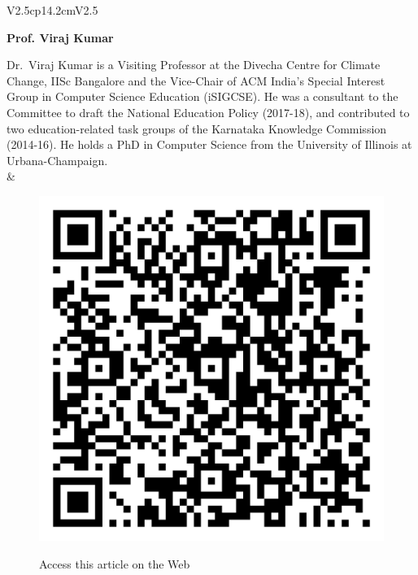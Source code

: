 \begin{tabular}{V{2.5}cp{14.2cm}V{2.5}}
\centerline{\large\bf Prof. Viraj Kumar}

\bigskip
Dr.~Viraj Kumar is a Visiting Professor at the Divecha Centre for Climate Change, IISc Bangalore and the Vice-Chair of ACM India’s Special Interest Group in Computer Science Education (iSIGCSE). He was a consultant to the Committee to draft the National Education Policy (2017-18), and contributed to two education-related task groups of the Karnataka Knowledge Commission (2014-16). He holds a PhD in Computer Science from the University of Illinois at Urbana-Champaign.\\
&\\
\end{tabular}


\begin{figure}[H]
\centering
\includegraphics[scale=.11]{src/Figures/QR-codes/qr-code_experiential-learning.png}

\medskip

{\large\sf Access this article on the Web}
\end{figure}


















